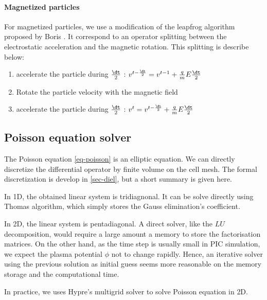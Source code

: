     \paragraph{Magnetized particles}
    For magnetized particles, we use a modification of the leapfrog algorithm proposed by Boris \cite{boris1970}.
    It correspond to an operator splitting between the electrostatic acceleration and the magnetic rotation.
    This splitting is describe below:

    \begin{enumerate}
      \item accelerate the particle during $\frac{\dt}{2}$ : $v^{t-\frac{\dt}{2}} = v^{t-1} + \frac{q}{m} E \frac{\dt}{2}$
      \item Rotate the particle velocity with the magnetic field
      \item accelerate the particle during $\frac{\dt}{2}$ : $v^t = v^{t-\frac{\dt}{2}} + \frac{q}{m} E \frac{\dt}{2}$
    \end{enumerate}


  \subsection{Poisson equation solver}
  \label{subsec-poissonintro}

    The Poisson equation \cref{eq-poisson} is an elliptic equation.
    We can directly discretize the differential operator by finite volume on the cell mesh.
    The formal discretization is develop in \cref{sec-diel}, but a short summary is given here.

    In \ac{1D}, the obtained linear system is tridiagnonal.
    It can be solve directly using {\sc Thomas} algorithm, which simply stores the Gauss elimination's coefficient.

    In \ac{2D}, the linear system is pentadiagonal.
    A direct solver, like the $LU$ decomposition, would require a large amount a memory to store the factorisation matrices.
    On the other hand, as the time step is usually small in \ac{PIC} simulation, we expect the plasma potential $\phi$ not to change rapidly.
    Hence, an iterative solver using the previous solution as initial guess seems more reasonable on the memory storage and the computational time.

    In practice, we uses {\sc Hypre}'s multigrid solver to solve Poisson equation in \ac{2D}.
